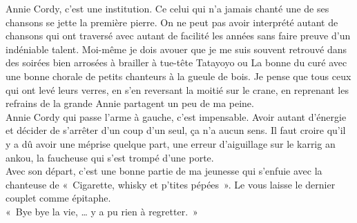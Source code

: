 Annie Cordy, c’est une institution. Ce celui qui n’a jamais chanté une de ses chansons se jette la première pierre. On ne peut pas avoir interprété autant de chansons qui ont traversé avec autant de facilité les années sans faire preuve d’un indéniable talent. Moi-même je dois avouer que je me suis souvent retrouvé dans des soirées bien arrosées à brailler à tue-tête Tatayoyo ou La bonne du curé avec une bonne chorale de petits chanteurs à la gueule de bois. Je pense que tous ceux qui ont levé leurs verres, en s’en reversant la moitié sur le crane, en reprenant les refrains de la grande Annie partagent un peu de ma peine.\\

Annie Cordy qui passe l’arme à gauche, c’est impensable. Avoir autant d’énergie et décider de s’arrêter d’un coup d’un seul, ça n’a aucun sens. Il faut croire qu’il y a dû avoir une méprise quelque part, une erreur d’aiguillage sur le karrig an ankou, la faucheuse qui s’est trompé d’une porte.\\

Avec son départ, c’est une bonne partie de ma jeunesse qui s’enfuie avec la chanteuse de « Cigarette, whisky et p’tites pépées ». Le vous laisse le dernier couplet comme épitaphe. \\


« Bye bye la vie, … y a pu rien à regretter. » 

